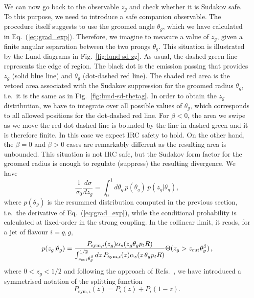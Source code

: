 We can now go back to the observable $z_g$ and check whether it is Sudakov safe. To this purpose, we need to introduce a safe companion observable. The \SD procedure itself suggests to use the groomed angle $\theta_g$, which we have calculated in Eq.~(\ref{eq:grad_exp}). 
Therefore, we imagine to measure a value of $z_g$, given a finite angular separation between the two prongs $\theta_g$. This situation is illustrated by the Lund diagrams in Fig.~\ref{fig:lund-sd-zg}. As usual, the dashed green line represents the edge of \SD region. The black dot is the emission passing \SD that provides $z_g$ (solid blue line) and $\theta_g$ (dot-dashed red line). The shaded red area is the vetoed area  associated with the Sudakov suppression for the groomed radius $\theta_g$, i.e.\ it is the same as in Fig.~\ref{fig:lund-sd-thetag}.
%
In order to obtain the $z_g$ distribution, we have to integrate over all possible values of $\theta_g$, which corresponds to all allowed positions for the dot-dashed red line. For $\beta<0$, the area we swipe as we move the red dot-dashed line is bounded by the \SD line in dashed green and it is therefore finite. In this case we expect IRC safety to hold. On the other hand, the $\beta=0$ and $\beta>0$ cases are remarkably different as the resulting area is unbounded. This situation is not IRC safe, but the Sudakov form factor for the groomed radius is enough to regulate (suppress) the resulting divergence. 
We have
\begin{equation}\label{eq:zg-cond-prob}
\frac{1}{\sigma_0}\frac{d \sigma}{d z_g} = \int_0^1 d \theta_g \, p(\theta_g) \, p(z_g|\theta_g),
\end{equation}
where $p(\theta_g)$ is the resummed distribution computed in the
previous section, i.e.\ the derivative of Eq.~(\ref{eq:grad_exp}),
while the conditional probability is calculated at fixed-order in the
strong coupling. In the collinear limit, it reads, for a jet of
flavour $i=q,g$,
\begin{equation}\label{eq:cond-explicit}
p(z_g|\theta_g ) =  \frac{P_{\text{sym},i}(z_g)\alpha_s(z_g \theta_g p_t R)}{\int_{z_\text{cut}\theta_g^\beta}^{1/2} d z \, P_{\text{sym},i}(z) \alpha_s(z \, \theta_g p_t R)} \Theta(z_g>z_{\text{cut}} \theta_g^\beta)\,,
\end{equation}
where $0 < z_g < 1/2$ and following the approach of Refs.~\cite{Larkoski:2015lea,Larkoski:2017bvj,Tripathee:2017ybi}, we have introduced a symmetrised notation of the splitting function
\begin{equation}
P_{\text{sym},i}(z)=P_i(z)+P_i(1-z).
\end{equation}
